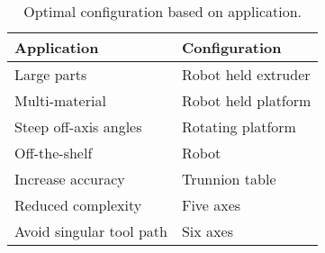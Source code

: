 \documentclass[main.tex]{subfiles}
\begin{document}
\begin{table}
	\caption{Optimal configuration based on application.}
	\centering
	\begin{tabular}{l l}
		\toprule
		\textbf{Application} & \textbf{Configuration} \\
		\midrule
		Large parts & Robot held extruder \\
		Multi-material & Robot held platform \\
		\addlinespace
		Steep off-axis angles & Rotating platform \\
		Off-the-shelf & Robot \\
		Increase accuracy & Trunnion table \\
		\addlinespace
		Reduced complexity & Five axes \\
		Avoid singular tool path & Six axes \\	
		\bottomrule		
	\end{tabular}	
	\label{table:configcompare}
\end{table}
\end{document}
